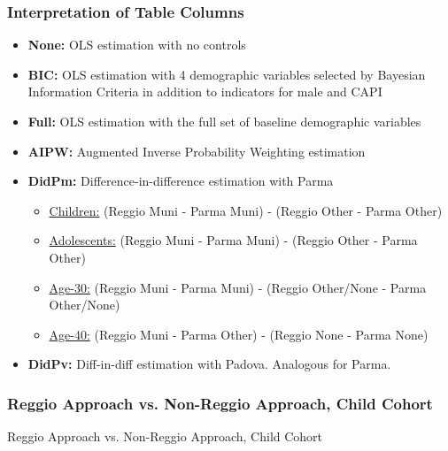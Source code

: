 \documentclass[static]{JJH-Beamer_PAGENOS}
\begin{document}
\begin{frame}
\frametitle{Interpretation of Table Columns}
\begin{footnotesize}
\begin{itemize}
	\item \textbf{None:} OLS estimation with no controls
	\item \textbf{BIC:} OLS estimation with 4 demographic variables selected by Bayesian Information Criteria in addition to indicators for male and CAPI	
	\item \textbf{Full:} OLS estimation with the full set of baseline demographic variables 
	\item \textbf{AIPW:} Augmented Inverse Probability Weighting estimation 
	\item \textbf{DidPm:} Difference-in-difference estimation with Parma
	
		\begin{itemize}
		\item \underline{Children:} (Reggio Muni - Parma Muni) - (Reggio Other - Parma Other)
		\item \underline{Adolescents:} (Reggio Muni - Parma Muni) - (Reggio Other - Parma Other) 
		\item \underline{Age-30:} (Reggio Muni - Parma Muni) - (Reggio Other/None - Parma Other/None)
		\item \underline{Age-40:} (Reggio Muni - Parma Other) - (Reggio None - Parma None)
		\end{itemize}
		
	\item \textbf{DidPv:} Diff-in-diff estimation with Padova. Analogous for Parma.
\end{itemize}
\end{footnotesize}
\end{frame}


\begin{frame}
\frametitle{Reggio Approach vs. Non-Reggio Approach, Child Cohort}
\centering
\begin{table}[H]
\caption{Reggio Approach vs. Non-Reggio Approach, Child Cohort}
\end{table}
\end{frame}
\end{document}
